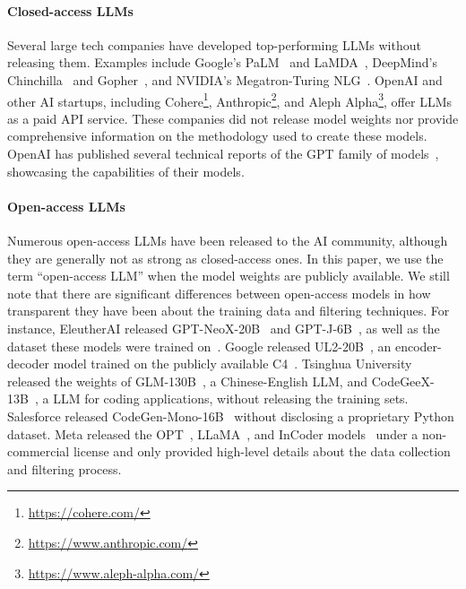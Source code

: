 \paragraph{Closed-access LLMs} Several large tech companies have developed top-performing LLMs without releasing them. Examples include Google's PaLM~\citep{chowdhery2022palm} and LaMDA~\citep{thoppilan2022lamda}, DeepMind's Chinchilla~\citep{hoffmann2022training} and Gopher~\citep{rae2021scaling}, and NVIDIA's Megatron-Turing NLG~\citep{smith2022using}. OpenAI and other AI startups, including Cohere\footnote{\url{https://cohere.com/}}, Anthropic\footnote{\url{https://www.anthropic.com/}}, and Aleph Alpha\footnote{\url{https://www.aleph-alpha.com/}}, offer LLMs as a paid API service. These companies did not release model weights nor provide comprehensive information on the methodology used to create these models. OpenAI has published several technical reports of the GPT family of models~\citep{brown2020language,chen2021codex,openai2023gpt4}, showcasing the capabilities of their models. 

\paragraph{Open-access LLMs} Numerous open-access LLMs have been released to the AI community, although they are generally not as strong as closed-access ones. In this paper, we use the term ``open-access LLM'' when the model weights are publicly available. We still note that there are significant differences between open-access models in how transparent they have been about the training data and filtering techniques. For instance, EleutherAI released GPT-NeoX-20B~\citep{black2022gpt} and GPT-J-6B~\citep{wang2021gpt}, as well as the dataset these models were trained on~\citep{gao2020pile}. Google released UL2-20B~\citep{tay2022unifying}, an encoder-decoder model trained on the publicly available C4~\citep{raffel2020exploring}. Tsinghua University released the weights of GLM-130B~\citep{zeng2022glm}, a Chinese-English LLM, and CodeGeeX-13B~\citep{qinkai:codegeex}, a LLM for coding applications, without releasing the training sets.  Salesforce released CodeGen-Mono-16B~\citep{nijkamp:codegen} without disclosing a proprietary Python dataset. Meta released the OPT~\citep{zhang2022opt}, LLaMA~\citep{touvron2023llama}, and InCoder models~\citep{fried2022incoder} under a non-commercial license and only provided high-level details about the data collection and filtering process.  

